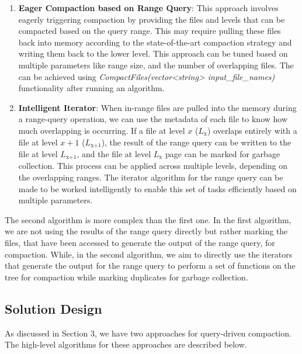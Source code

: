 \documentclass[balance=false, sigconf]{acmart}
\begin{document}
\begin{enumerate}
    \item \textbf{Eager Compaction based on Range Query}: This approach involves eagerly triggering compaction by providing the files and levels that can be compacted based on the query range. This may require pulling these files back into memory according to the state-of-the-art compaction strategy and writing them back to the lower level. This approach can be tuned based on multiple parameters like range size, and the number of overlapping files. The can be achieved using \textit{CompactFiles(vector<string> input\_file\_names)} functionality after running an algorithm.
    
    \item \textbf{Intelligent Iterator}: When in-range files are pulled into the memory during a range-query operation, we can use the metadata of each file to know how much overlapping is occurring. If a file at level $x$ ($L_\text{x}$) overlaps entirely with a file at level $x+1$ ($L_\text{x+1}$), the result of the range query can be written to the file at level $L_\text{x+1}$, and the file at level $L_\text{x}$ page can be marked for garbage collection. This process can be applied across multiple levels, depending on the overlapping ranges. The iterator algorithm for the range query can be made to be worked intelligently to enable this set of tasks efficiently based on multiple parameters.
\end{enumerate}

The second algorithm is more complex than the first one. In the first algorithm, we are not using the results of the range query directly but rather marking the files, that have been accessed to generate the output of the range query, for compaction. While, in the second algorithm, we aim to directly use the iterators that generate the output for the range query to perform a set of functions on the tree for compaction while marking duplicates for garbage collection. 

\subsection{Solution Design}
As discussed in Section 3, we have two approaches for query-driven compaction. The high-level algorithms for these approaches are described below.
\end{document}
